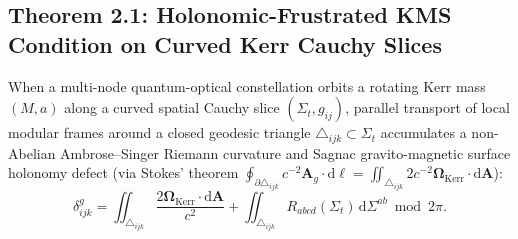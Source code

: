 \documentclass[11pt,a4paper,reqno]{article}
\theoremstyle{plain}
\theoremstyle{definition}
\theoremstyle{remark}
\numberwithin{equation}{section}
\begin{document}
\subsection{Theorem 2.1: Holonomic-Frustrated KMS Condition on Curved Kerr Cauchy Slices}
When a multi-node quantum-optical constellation orbits a rotating Kerr mass $(M, a)$ along a curved spatial Cauchy slice $(\Sigma_t, g_{ij})$, parallel transport of local modular frames around a closed geodesic triangle $\triangle_{ijk} \subset \Sigma_t$ accumulates a non-Abelian Ambrose--Singer Riemann curvature and Sagnac gravito-magnetic surface holonomy defect (via Stokes' theorem $\oint_{\partial\triangle_{ijk}} c^{-2}\mathbf{A}_g \cdot \mathrm{d}\bm{\ell} = \iint_{\triangle_{ijk}} 2c^{-2}\bm{\Omega}_{\mathrm{Kerr}} \cdot \mathrm{d}\mathbf{A}$):
\begin{equation}
\label{eq:holonomy_defect}
\delta_{ijk}^g = \iint_{\triangle_{ijk}} \frac{2\bm{\Omega}_{\mathrm{Kerr}} \cdot \mathrm{d}\mathbf{A}}{c^2} + \iint_{\triangle_{ijk}} R_{abcd}(\Sigma_t)\, \mathrm{d}\Sigma^{ab} \bmod 2\pi.
\end{equation}
\end{document}
